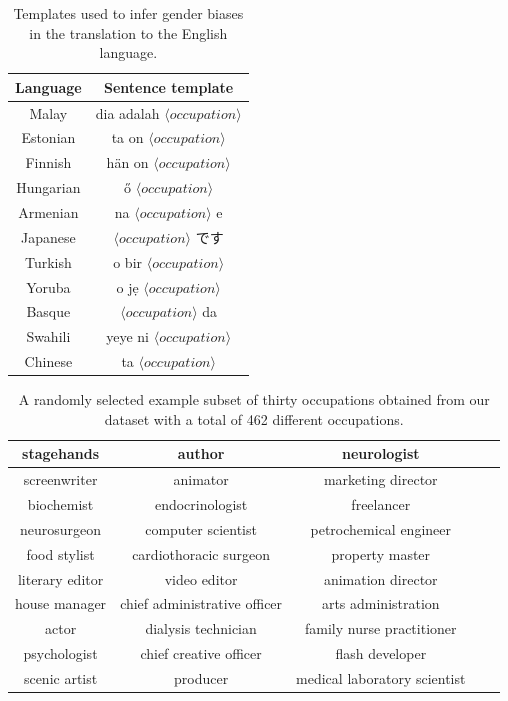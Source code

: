 \documentclass[jair,twoside,11pt,theapa]{article}
\begin{document}
\begin{table}[H]
  \centering
  \begin{tabular}{|c|c|}
  \hline
  Language  & Sentence template \\ \hline \hline
  Malay   & dia adalah $\langle occupation \rangle$ \\ \hline
  Estonian  & ta on $\langle occupation \rangle$ \\ \hline
  Finnish   & hän on $\langle occupation \rangle$ \\ \hline
  Hungarian & ő $\langle occupation \rangle$ \\ \hline
  Armenian  & na $\langle occupation \rangle$ e \\ \hline
  Japanese  & $\langle occupation \rangle$ です\\ \hline
  Turkish   & o bir $\langle occupation \rangle$ \\ \hline
  Yoruba    & o jẹ $\langle occupation \rangle$ \\ \hline
  Basque    & $\langle occupation \rangle$ da \\ \hline
  Swahili   & yeye ni $\langle occupation \rangle$ \\ \hline
  Chinese   & ta $\langle occupation \rangle$ \\ \hline
  \end{tabular}
  \caption{Templates used to infer gender biases in the translation to the English language.}
  \label{tab:templates}
\end{table}

\begin{table}[H]
  \centering
  \begin{tabular}{|c|c|c|c|c|}
  \hline
  stagehands & author & neurologist \\ \hline
  screenwriter & animator & marketing director \\ \hline
  biochemist & endocrinologist & freelancer \\ \hline
  neurosurgeon & computer scientist & petrochemical engineer \\ \hline
  food stylist & cardiothoracic surgeon & property master \\ \hline
  literary editor & video editor & animation director \\ \hline
  house manager & chief administrative officer & arts administration \\ \hline
  actor & dialysis technician & family nurse practitioner \\ \hline
  psychologist & chief creative officer & flash developer \\ \hline
  scenic artist & producer & medical laboratory scientist \\ \hline
  \end{tabular}
  \caption{A randomly selected example subset of thirty occupations obtained from our dataset with a total of 462 different occupations.}
  \label{tab:occupations-examples}
\end{table}
\end{document}
